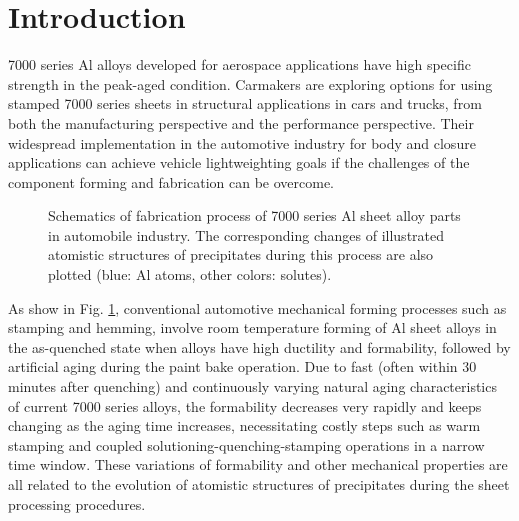 \section{Introduction}
\label{Chap:Al/Vac:section:Intro}

7000 series Al alloys developed for aerospace applications have high specific strength in the peak-aged condition. Carmakers are exploring options for using stamped 7000 series sheets in structural applications in cars and trucks, from both the manufacturing perspective and the performance perspective. Their widespread implementation in the automotive industry for body and closure applications can achieve vehicle lightweighting goals if the challenges of the component forming and fabrication can be overcome. \cite{fridlyander2002aluminum,hirsch2011aluminium,hirsch2014recent}

\begingroup
\begin{figure}[!ht]
  \centering
\caption[Schematics of fabrication process of 7000 series Al sheet alloy parts in automobile industry.]{Schematics of fabrication process of 7000 series Al sheet alloy parts in automobile industry. The corresponding changes of illustrated atomistic structures of precipitates during this process are also plotted (blue: Al atoms, other colors: solutes).}
  \label{Chap:Al/Vac:fig1}
\end{figure}
\endgroup

As show in Fig. \ref{Chap:Al/Vac:fig1}, conventional automotive mechanical forming processes such as stamping and hemming, involve room temperature forming of Al sheet alloys in the as-quenched state when alloys have high ductility and formability, followed by artificial aging during the paint bake operation. Due to fast (often within 30 minutes after quenching) and continuously varying natural aging characteristics of current 7000 series alloys, the formability decreases very rapidly and keeps changing as the aging time increases, necessitating costly steps such as warm stamping and coupled solutioning-quenching-stamping operations in a narrow time window. \cite{bryant1999effects,li2004biaxial} These variations of formability and other mechanical properties are all related to the evolution of atomistic structures of precipitates during the sheet processing procedures.

